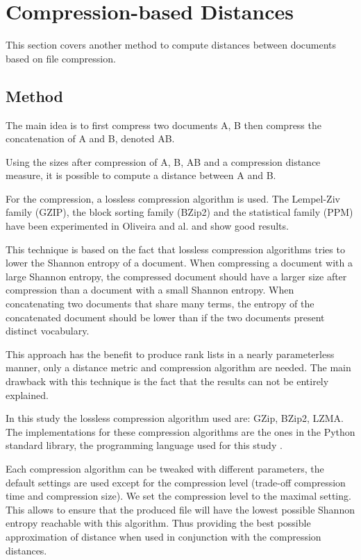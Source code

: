 \section{Compression-based Distances \label{sec:compression_based_distances}}

This section covers another method to compute distances between documents based on file compression.

\subsection{Method}

The main idea is to first compress two documents A, B then compress the concatenation of A and B, denoted AB.

Using the sizes after compression of A, B, AB and a compression distance measure, it is possible to compute a distance between A and B.

For the compression, a lossless compression algorithm is used.
The Lempel-Ziv family (GZIP), the block sorting family (BZip2) and the statistical family (PPM) have been experimented in Oliveira and al. \cite{comparing_compression} and show good results.

This technique is based on the fact that lossless compression algorithms tries to lower the Shannon entropy of a document.
When compressing a document with a large Shannon entropy, the compressed document should have a larger size after compression than a document with a small Shannon entropy.
When concatenating two documents that share many terms, the entropy of the concatenated document should be lower than if the two documents present distinct vocabulary.

This approach has the benefit to produce rank lists in a nearly parameterless manner, only a distance metric and compression algorithm are needed.
The main drawback with this technique is the fact that the results can not be entirely explained.

In this study the lossless compression algorithm used are: GZip, BZip2, LZMA.
The implementations for these compression algorithms are the ones in the Python standard library, the programming language used for this study \cite{python_standard_library}.

Each compression algorithm can be tweaked with different parameters, the default settings are used except for the compression level (trade-off compression time and compression size).
We set the compression level to the maximal setting.
This allows to ensure that the produced file will have the lowest possible Shannon entropy reachable with this algorithm.
Thus providing the best possible approximation of distance when used in conjunction with the compression distances.

